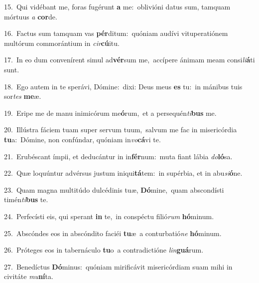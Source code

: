 {\numbfont\textcolor{\numbcolor}{15.}}~Qui vidébant me, foras fugérunt \textbf{a} me:~\star oblivióni datus sum, tamquam mórtuus \textit{a} \textbf{cor}\-de.\par
{\numbfont\textcolor{\numbcolor}{16.}}~Factus sum tamquam vas \textbf{pér}\-ditum:~\star quóniam audívi vituperatiónem multórum commorántium in \textit{cir}\-\textbf{cú}itu.\par
{\numbfont\textcolor{\numbcolor}{17.}}~In eo dum convenírent simul ad\-\textbf{vér}\-sum me,~\star accípere ánimam meam consi\-\textit{li}\-\textbf{á}ti sunt.\par
{\numbfont\textcolor{\numbcolor}{18.}}~Ego autem in te sperávi, Dómine:~\dagger dixi: Deus meus \textbf{es} tu:~\star in mánibus tuis sor\textit{tes} \textbf{me}\-æ.\par
{\numbfont\textcolor{\numbcolor}{19.}}~Eripe me de manu inimicórum me\-\textbf{ó}\-rum,~\star et a persequén\-\textit{ti}\-\textbf{bus} me.\par
{\numbfont\textcolor{\numbcolor}{20.}}~Illústra fáciem tuam super servum tuum,~\dagger salvum me fac in misericórdia \textbf{tu}\-a:~\star Dómine, non confúndar, quóniam in\-\textit{vo}\-\textbf{cá}vi te.\par
{\numbfont\textcolor{\numbcolor}{21.}}~Erubéscant ímpii, et deducántur in in\-\textbf{fér}\-num:~\star muta fiant lábia \textit{do}\-\textbf{ló}sa.\par
{\numbfont\textcolor{\numbcolor}{22.}}~Quæ loquúntur advérsus justum iniqui\-\textbf{tá}\-tem:~\star in supérbia, et in abu\-\textit{si}\-\textbf{ó}ne.\par
{\numbfont\textcolor{\numbcolor}{23.}}~Quam magna multitúdo dulcédinis tuæ, \textbf{Dó}\-mine,~\star quam abscondísti timén\-\textit{ti}\-\textbf{bus} te.\par
{\numbfont\textcolor{\numbcolor}{24.}}~Perfecísti eis, qui sperant \textbf{in} te,~\star in conspéctu filió\textit{rum} \textbf{hó}\-minum.\par
{\numbfont\textcolor{\numbcolor}{25.}}~Abscóndes eos in abscóndito faciéi \textbf{tu}\-æ~\star a conturbatió\textit{ne} \textbf{hó}\-minum.\par
{\numbfont\textcolor{\numbcolor}{26.}}~Próteges eos in tabernáculo \textbf{tu}\-o~\star a contradictióne \textit{lin}\-\textbf{guá}rum.\par
{\numbfont\textcolor{\numbcolor}{27.}}~Benedíctus \textbf{Dó}\-minus:~\star quóniam mirificávit misericórdiam suam mihi in civitáte \textit{mu}\-\textbf{ní}ta.\par
